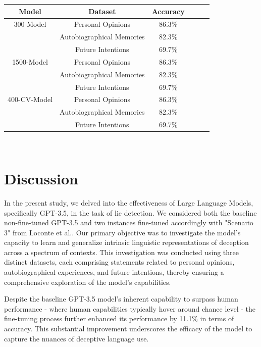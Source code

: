 \documentclass[10pt,twocolumn,letterpaper]{article}
\begin{document}
\begin{center}

    \begin{tabular}{cccccc}
        \toprule
        Model & Dataset & Accuracy \\
        \midrule
        300-Model & Personal Opinions & 86.3\% \\
         & Autobiographical Memories & 82.3\% \\
         & Future Intentions & 69.7\% \\
        \midrule
        1500-Model & Personal Opinions & 86.3\% \\
         & Autobiographical Memories & 82.3\% \\
         & Future Intentions & 69.7\% \\
         \midrule
         400-CV-Model & Personal Opinions & 86.3\% \\
          & Autobiographical Memories & 82.3\% \\
          & Future Intentions & 69.7\% \\
        \bottomrule
    \end{tabular}

\end{center} \\

\section{Discussion}


In the present study, we delved into the effectiveness of Large Language Models, specifically GPT-3.5, in the task of lie detection.
We considered both the baseline non-fine-tuned GPT-3.5 and two instances fine-tuned accordingly with "Scenario 3" from Loconte et al.\cite{Loconte}. 
Our primary objective was to investigate the model's capacity to learn and generalize intrinsic linguistic representations of deception 
across a spectrum of contexts. This investigation was conducted using three distinct datasets, each comprising 
statements related to personal opinions, autobiographical experiences, and future intentions, thereby ensuring 
a comprehensive exploration of the model's capabilities.

Despite the baseline GPT-3.5 model's inherent capability to surpass human performance - where human capabilities 
typically hover around chance level - the fine-tuning process further enhanced its performance by 11.1\% in terms 
of accuracy. This substantial improvement underscores the efficacy of the model to capture the nuances of deceptive language use.
\end{document}
